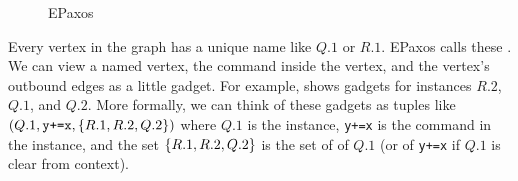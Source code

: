 \begin{figure}[h]
  \centering
  \caption{EPaxos}
\end{figure}

Every vertex in the graph has a unique name like $Q.1$ or $R.1$. EPaxos calls
these . We can view a named vertex, the command inside the
vertex, and the vertex's outbound edges as a little gadget. For example,
 shows gadgets for instances $R.2$, $Q.1$, and $Q.2$.
%
More formally, we can think of these gadgets as tuples like $(Q.1,
\texttt{y+=x}, \{R.1, R.2, Q.2\})$ where $Q.1$ is the instance, \texttt{y+=x}
is the command in the instance, and the set $\{R.1, R.2, Q.2\}$ is the set of
 of $Q.1$ (or of \texttt{y+=x} if $Q.1$ is clear from
context).

